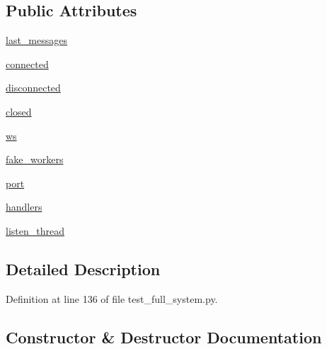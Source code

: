 \subsection*{Public Attributes}
\begin{DoxyCompactItemize}
\item 
\hyperlink{classparlai_1_1mturk_1_1core_1_1dev_1_1test_1_1test__full__system_1_1MockSocket_af4818cb8c3b13af3af1facf13279cd34}{last\+\_\+messages}
\item 
\hyperlink{classparlai_1_1mturk_1_1core_1_1dev_1_1test_1_1test__full__system_1_1MockSocket_a0037afa3da5e2ae6d361b9302f023d2d}{connected}
\item 
\hyperlink{classparlai_1_1mturk_1_1core_1_1dev_1_1test_1_1test__full__system_1_1MockSocket_a0e0c2616a26cc49ffcf1fddc321be0d9}{disconnected}
\item 
\hyperlink{classparlai_1_1mturk_1_1core_1_1dev_1_1test_1_1test__full__system_1_1MockSocket_a67852fab5c532fd3234e9d3576b902d4}{closed}
\item 
\hyperlink{classparlai_1_1mturk_1_1core_1_1dev_1_1test_1_1test__full__system_1_1MockSocket_acea3529814ac7c5c3a945af3bdc9dd18}{ws}
\item 
\hyperlink{classparlai_1_1mturk_1_1core_1_1dev_1_1test_1_1test__full__system_1_1MockSocket_a1863a94d228a5fbe463ec63dc46a5981}{fake\+\_\+workers}
\item 
\hyperlink{classparlai_1_1mturk_1_1core_1_1dev_1_1test_1_1test__full__system_1_1MockSocket_a94d66a2b377879cba3c04ffebc41656e}{port}
\item 
\hyperlink{classparlai_1_1mturk_1_1core_1_1dev_1_1test_1_1test__full__system_1_1MockSocket_a04cddff7681693b65ce05eeda7764f94}{handlers}
\item 
\hyperlink{classparlai_1_1mturk_1_1core_1_1dev_1_1test_1_1test__full__system_1_1MockSocket_a615218ba99b0538a24be27054132c6f2}{listen\+\_\+thread}
\end{DoxyCompactItemize}


\subsection{Detailed Description}


Definition at line 136 of file test\+\_\+full\+\_\+system.\+py.



\subsection{Constructor \& Destructor Documentation}
\mbox{\label{classparlai_1_1mturk_1_1core_1_1dev_1_1test_1_1test__full__system_1_1MockSocket_a6071401c1d99ecfa1627e9578caeab40}} 
